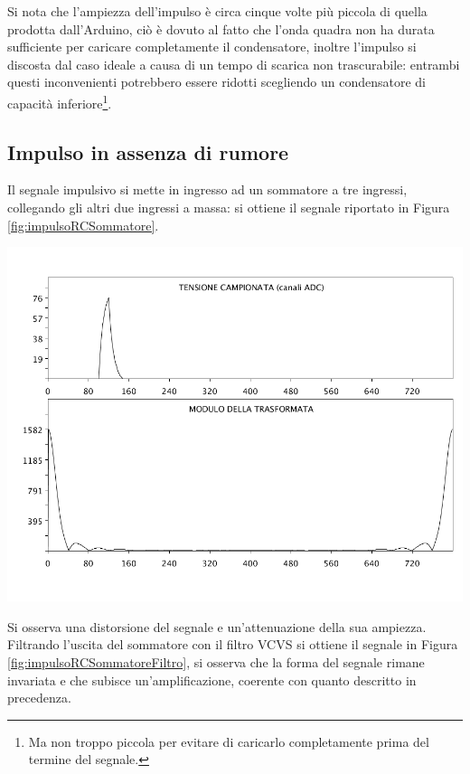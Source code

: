 \documentclass[10pt,oneside,a4paper]{article}
\newenvironment{Figure}
  {\par\medskip\noindent\minipage{\linewidth}}
  {\endminipage\par\medskip}
\begin{document}
\begin{multicols}{2}
Si nota che l'ampiezza dell'impulso è circa cinque volte più piccola di quella prodotta dall'Arduino, ciò è dovuto al fatto che l'onda quadra non ha durata sufficiente per caricare completamente il condensatore, inoltre l'impulso si discosta dal caso ideale a causa di un tempo di scarica non trascurabile: entrambi questi inconvenienti potrebbero essere ridotti scegliendo un condensatore di capacità inferiore\footnote{Ma non troppo piccola per evitare di caricarlo completamente prima del termine del segnale.}.

\subsection{Impulso in assenza di rumore}
Il segnale impulsivo si mette in ingresso ad un sommatore a tre ingressi, collegando gli altri due ingressi a massa: si ottiene il segnale riportato in Figura \ref{fig:impulsoRCSommatore}.
\begin{Figure}
	\begin{center}
	\includegraphics[width=0.9\linewidth]{impulsoRCSommatore}
	\label{fig:impulsoRCSommatore}
	\end{center}
\end{Figure}
Si osserva una distorsione del segnale e un'attenuazione della sua ampiezza. Filtrando l'uscita del sommatore con il filtro VCVS si ottiene il segnale in Figura \ref{fig:impulsoRCSommatoreFiltro}, si osserva che la forma del segnale rimane invariata e che subisce un'amplificazione, coerente con quanto descritto in precedenza.
\begin{Figure}
	\begin{center}

\end{center}
\end{Figure}
\end{multicols}
\end{document}
